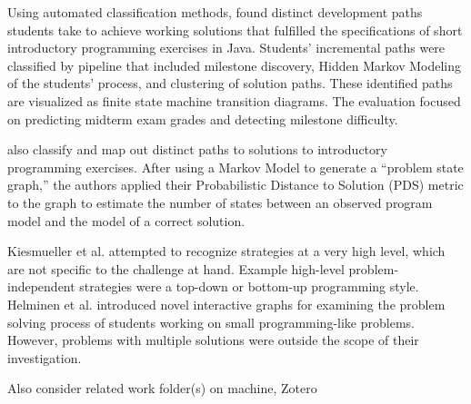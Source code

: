 Using automated classification methods, \citet{Piech} found distinct development paths students take to achieve working solutions that fulfilled the specifications of short introductory programming exercises in Java. Students' incremental paths were classified by pipeline that included milestone discovery, Hidden Markov Modeling of the students' process, and clustering of solution paths. These identified paths are visualized as finite state machine transition diagrams. The evaluation focused on predicting midterm exam grades and detecting milestone difficulty.

\citet{sudol12} also classify and map out distinct paths to solutions to introductory programming exercises. After using a Markov Model to generate a ``problem state graph,'' the authors applied their Probabilistic Distance to Solution (PDS) metric to the graph to estimate the number of states between an observed program model and the model of a correct solution.

Kiesmueller et al. \cite{Kiesmueller} attempted to recognize strategies at a very high level, which are not specific to the challenge at hand. Example high-level problem-independent strategies were a top-down or bottom-up programming style. Helminen et al. \cite{ICERHelminen} introduced novel interactive graphs for examining the problem solving process of students working on small programming-like problems. However, problems with multiple solutions were outside the scope of their investigation.








Also consider related work folder(s) on machine, Zotero




